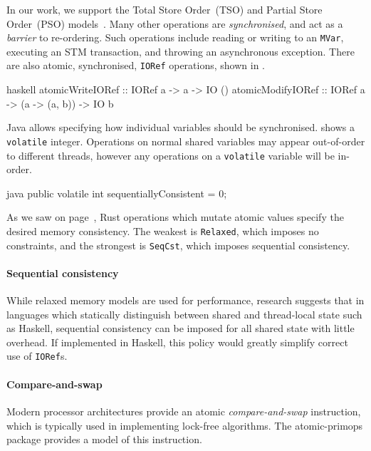 In our work, we support the Total Store Order~(TSO) and Partial Store
Order~(PSO) models~.  Many other operations are
\emph{synchronised}, and act as a \emph{barrier} to re-ordering.  Such
operations include reading or writing to an \verb|MVar|, executing an
STM transaction, and throwing an asynchronous exception.  There are
also atomic, synchronised, \verb|IORef| operations, shown in
.

\begin{listing}
\centering
\begin{cminted}{haskell}
atomicWriteIORef  :: IORef a -> a -> IO ()
atomicModifyIORef :: IORef a -> (a -> (a, b)) -> IO b
\end{cminted}
\caption{Atomic operations in Haskell.}\label{lst:atomic_haskell}
\end{listing}

Java allows specifying how individual variables should be
synchronised.   shows a \verb|volatile| integer.
Operations on normal shared variables may appear out-of-order to
different threads, however any operations on a \verb|volatile|
variable will be in-order.

\begin{listing}
\centering
\begin{cminted}{java}
public volatile int sequentiallyConsistent = 0;
\end{cminted}
\caption{Atomic operations in Java.}\label{lst:atomic_java}
\end{listing}

As we saw on page~\pageref{page:rust_mem}, Rust operations which
mutate atomic values specify the desired memory consistency.  The
weakest is \verb|Relaxed|, which imposes no constraints, and the
strongest is \verb|SeqCst|, which imposes sequential consistency.

\paragraph{Sequential consistency}
While relaxed memory models are used for performance, research
suggests that in languages which statically distinguish between shared
and thread-local state such as Haskell, sequential consistency can be
imposed for all shared state with little overhead\cite{vollmer2017}.
If implemented in Haskell, this policy would greatly simplify correct
use of \verb|IORef|s.

\paragraph{Compare-and-swap}
Modern processor architectures provide an atomic
\emph{compare-and-swap} instruction, which is typically used in
implementing lock-free algorithms\cite{dice2013}.  The
atomic-primops\cite{atomic_primops} package provides a model of this
instruction.

